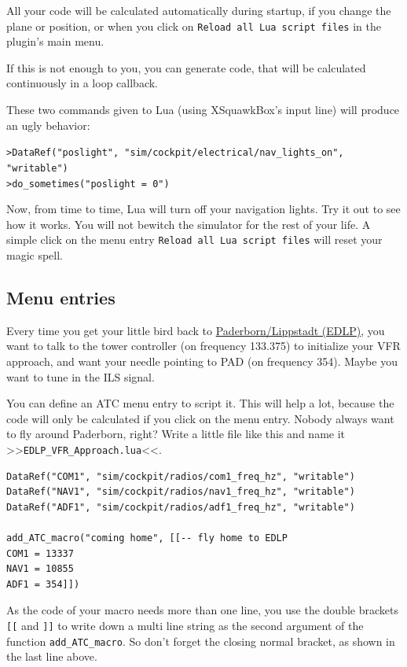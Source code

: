 \documentclass[11pt,parskip=half,a4paper]{scrartcl}
\begin{document}
All your code will be calculated automatically during startup, if you change the plane or position, or when you click on \verb|Reload all Lua script files| in the plugin's main menu.

If this is not enough to you, you can generate code, that will be calculated continuously in a loop callback.

These two commands given to Lua (using XSquawkBox's input line) will produce an ugly behavior:

\verb|>DataRef("poslight", "sim/cockpit/electrical/nav_lights_on", "writable")|\\
\verb|>do_sometimes("poslight = 0")|

Now, from time to time, Lua will turn off your navigation lights. Try it out to see how it works. You will not bewitch the simulator for the rest of your life. A simple click on the menu entry \verb|Reload all Lua script files| will reset your magic spell.

\subsection{Menu entries}

Every time you get your little bird back to \href{http://nav.vatsim-germany.org/files/edgg/charts/edlp/public/EDLP_ILS24.pdf}{Paderborn/Lippstadt (EDLP)}, you want to talk to the tower controller (on frequency 133.375) to initialize your VFR approach, and want your needle pointing to PAD (on frequency 354). Maybe you want to tune in the ILS signal.

You can define an ATC menu entry to script it. This will help a lot, because the code will only be calculated if you click on the menu entry. Nobody always want to fly around Paderborn, right? Write a little file like this and name it >>\verb|EDLP_VFR_Approach.lua|<<.

\begin{lstlisting}
DataRef("COM1", "sim/cockpit/radios/com1_freq_hz", "writable")
DataRef("NAV1", "sim/cockpit/radios/nav1_freq_hz", "writable")
DataRef("ADF1", "sim/cockpit/radios/adf1_freq_hz", "writable")

add_ATC_macro("coming home", [[-- fly home to EDLP
COM1 = 13337
NAV1 = 10855
ADF1 = 354]])
\end{lstlisting}

As the code of your macro needs more than one line, you use the double brackets \verb|[[| and \verb|]]| to write down a multi line string as the second argument of the function \verb|add_ATC_macro|. So don't forget the closing normal bracket, as shown in the last line above.
\end{document}
